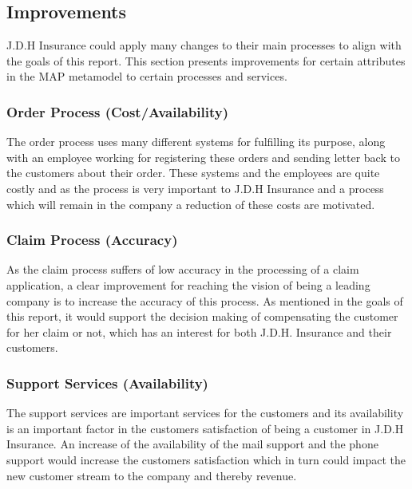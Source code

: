 \subsection{Improvements}
\label{sec:improvements}
J.D.H Insurance could apply many changes to their main processes to align with the goals of this report. This section presents improvements for certain attributes in the MAP metamodel to certain processes and services.
\subsubsection{Order Process (Cost/Availability)}
The order process uses many different systems for fulfilling its purpose, along with an employee working for registering these orders and sending letter back to the customers about their order. These systems and the employees are quite costly and as the process is very important to J.D.H Insurance and a process which will remain in the company a reduction of these costs are motivated.
\subsubsection{Claim Process (Accuracy)}
As the claim process suffers of low accuracy in the processing of a claim application, a clear improvement for reaching the vision of being a leading company is to increase the accuracy of this process. As mentioned in the goals of this report, it would support the decision making of compensating the customer for her claim or not, which has an interest for both J.D.H. Insurance and their customers.
\subsubsection{Support Services (Availability)}
The support services are important services for the customers and its availability is an important factor in the customers satisfaction of being a customer in J.D.H Insurance. An increase of the availability of the mail support and the phone support would increase the customers satisfaction which in turn could impact the new customer stream to the company and thereby revenue.